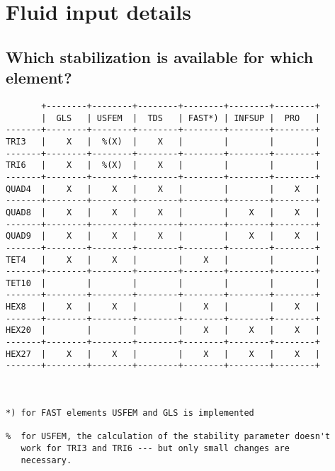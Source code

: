 

\chapter{Fluid input details}

\section{Which stabilization is available for which element?}

\begin{verbatim}
       +--------+--------+--------+--------+--------+--------+
       |  GLS   | USFEM  |  TDS   | FAST*) | INFSUP |  PRO   |
-------+--------+--------+--------+--------+--------+--------+
TRI3   |    X   |  %(X)  |    X   |        |        |        |
-------+--------+--------+--------+--------+--------+--------+
TRI6   |    X   |  %(X)  |    X   |        |        |        |
-------+--------+--------+--------+--------+--------+--------+
QUAD4  |    X   |    X   |    X   |        |        |    X   |
-------+--------+--------+--------+--------+--------+--------+
QUAD8  |    X   |    X   |    X   |        |    X   |    X   |
-------+--------+--------+--------+--------+--------+--------+
QUAD9  |    X   |    X   |    X   |        |    X   |    X   |
-------+--------+--------+--------+--------+--------+--------+
TET4   |    X   |    X   |        |    X   |        |        |
-------+--------+--------+--------+--------+--------+--------+
TET10  |        |        |        |        |        |        |
-------+--------+--------+--------+--------+--------+--------+
HEX8   |    X   |    X   |        |    X   |        |    X   |
-------+--------+--------+--------+--------+--------+--------+
HEX20  |        |        |        |    X   |    X   |    X   |
-------+--------+--------+--------+--------+--------+--------+
HEX27  |    X   |    X   |        |    X   |    X   |    X   |
-------+--------+--------+--------+--------+--------+--------+



*) for FAST elements USFEM and GLS is implemented

%  for USFEM, the calculation of the stability parameter doesn't
   work for TRI3 and TRI6 --- but only small changes are 
   necessary.
\end{verbatim}

